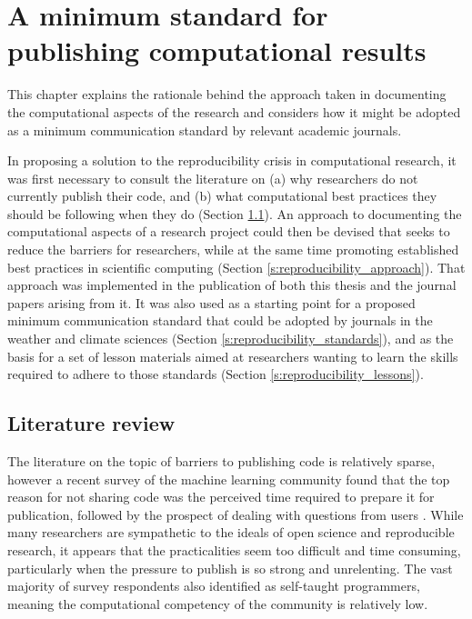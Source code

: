 
\chapter{A minimum standard for publishing computational results}\label{c:reproducibility}


\begin{synopsis}

This chapter explains the rationale behind the approach taken in documenting the computational aspects of the research and considers how it might be adopted as a minimum communication standard by relevant academic journals.

\end{synopsis}



In proposing a solution to the reproducibility crisis in computational research, it was first necessary to consult the literature on (a) why researchers do not currently publish their code, and (b) what computational best practices they should be following when they do (Section \ref{s:reproducibility_review}). An approach to documenting the computational aspects of a research project could then be devised that seeks to reduce the barriers for researchers, while at the same time promoting established best practices in scientific computing (Section \ref{s:reproducibility_approach}). That approach was implemented in the publication of both this thesis and the journal papers arising from it. It was also used as a starting point for a proposed minimum communication standard that could be adopted by journals in the weather and climate sciences (Section \ref{s:reproducibility_standards}), and as the basis for a set of lesson materials aimed at researchers wanting to learn the skills required to adhere to those standards (Section \ref{s:reproducibility_lessons}). 



\section{Literature review}\label{s:reproducibility_review}

The literature on the topic of barriers to publishing code is relatively sparse, however a recent survey of the machine learning community found that the top reason for not sharing code was the perceived time required to prepare it for publication, followed by the prospect of dealing with questions from users \citep{Stodden2010}. While many researchers are sympathetic to the ideals of open science and reproducible research, it appears that the practicalities seem too difficult and time consuming, particularly when the pressure to publish is so strong and unrelenting. The vast majority of survey respondents also identified as self-taught programmers, meaning the computational competency of the community is relatively low. 

